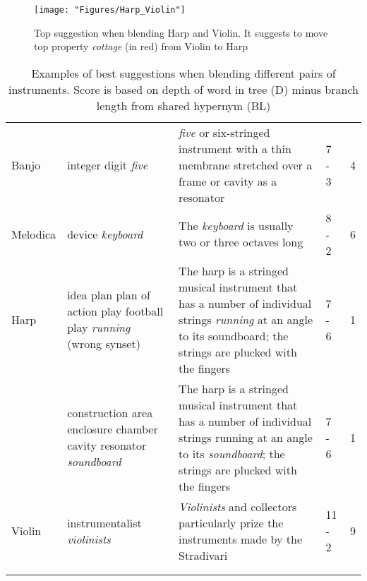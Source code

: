 \begin{figure} \centering \texttt{[image: "Figures/Harp\_Violin"]} \caption{Top suggestion when blending Harp and Violin. It suggests to move top property \emph{cottage} (in red) from Violin to Harp } \label{ Harp-Violin } \end{figure}

\begin{table}
	\caption{Examples of best suggestions when blending different pairs of instruments. Score is based on depth of word in tree (D) minus branch length from shared hypernym (BL)}
	\label{tab:topscoringexamples}
	\centering
	\begin{tabular}{l p{30mm} p{30mm} l l}
		\toprule
		\tabhead{Instrument} & \tabhead{Top scoring branch} & \tabhead{Context} & \tabhead{D - BL} & \tabhead{Score} \\
		\midrule
		Banjo &
		integer \newline
		digit \newline
		\emph{five} & \emph{five} or six-stringed instrument with a thin membrane stretched over a frame or cavity as a resonator & 7 - 3 & 4	\\
		Melodica &
		device \newline 
		\emph{keyboard} &
		The \emph{keyboard} is usually two or three octaves long & 8 - 2 &	6
		\\
		\midrule
		Harp &
		idea \newline
		plan \newline
		plan of action \newline
		play \newline
		football play \newline
		\emph{running} \newline
		(wrong synset) & The harp is a stringed musical instrument that has a number of individual strings \emph{running} at an angle to its soundboard; the strings are plucked with the fingers & 7 - 6 & 1	\\
		 &
		construction \newline
		area \newline
		enclosure \newline
		chamber \newline
		cavity resonator \newline
		\emph{soundboard} &
		The harp is a stringed musical instrument that has a number of individual strings running at an angle to its \emph{soundboard}; the strings are plucked with the fingers & 7 - 6 &	1 \\
		Violin &
		instrumentalist \newline
		\emph{violinists} & \emph{Violinists} and collectors particularly prize the instruments made by the Stradivari & 11 - 2 & 9	\\
		\\
		\bottomrule\\
	\end{tabular}
\end{table}

